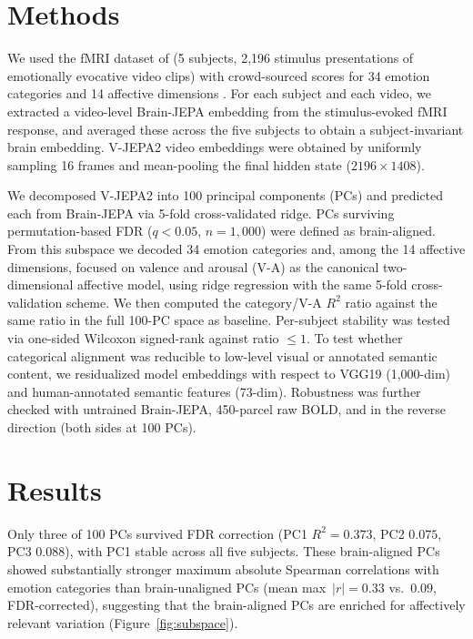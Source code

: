 \documentclass[extended-abstract]{ccn}
\begin{document}
\section{Methods}

We used the fMRI dataset of \citet{Horikawa2020} (5 subjects, 2{,}196 stimulus presentations of emotionally evocative video clips) with crowd-sourced scores for 34 emotion categories and 14 affective dimensions \citep{CowenKeltner2017}.
For each subject and each video, we extracted a video-level Brain-JEPA embedding from the stimulus-evoked fMRI response, and averaged these across the five subjects to obtain a subject-invariant brain embedding.
V-JEPA2 video embeddings were obtained by uniformly sampling 16 frames and mean-pooling the final hidden state ($2196 \times 1408$).

We decomposed V-JEPA2 into 100 principal components (PCs) and predicted each from Brain-JEPA via 5-fold cross-validated ridge.
PCs surviving permutation-based FDR ($q<0.05$, $n=1{,}000$) were defined as brain-aligned.
From this subspace we decoded 34 emotion categories and, among the 14 affective dimensions, focused on valence and arousal (V-A) as the canonical two-dimensional affective model, using ridge regression with the same 5-fold cross-validation scheme.
We then computed the category/V-A $R^2$ ratio against the same ratio in the full 100-PC space as baseline.
Per-subject stability was tested via one-sided Wilcoxon signed-rank against ratio $\leq 1$.
To test whether categorical alignment was reducible to low-level visual or annotated semantic content, we residualized model embeddings with respect to VGG19 (1{,}000-dim) and human-annotated semantic features (73-dim).
Robustness was further checked with untrained Brain-JEPA, 450-parcel raw BOLD, and in the reverse direction (both sides at 100 PCs).

\section{Results}

Only three of 100 PCs survived FDR correction (PC1 $R^2=0.373$, PC2 $0.075$, PC3 $0.088$), with PC1 stable across all five subjects.
These brain-aligned PCs showed substantially stronger maximum absolute Spearman correlations with emotion categories than brain-unaligned PCs (mean max~$|r|=0.33$ vs.~$0.09$, FDR-corrected), suggesting that the brain-aligned PCs are enriched for affectively relevant variation (Figure~\ref{fig:subspace}).
\end{document}
